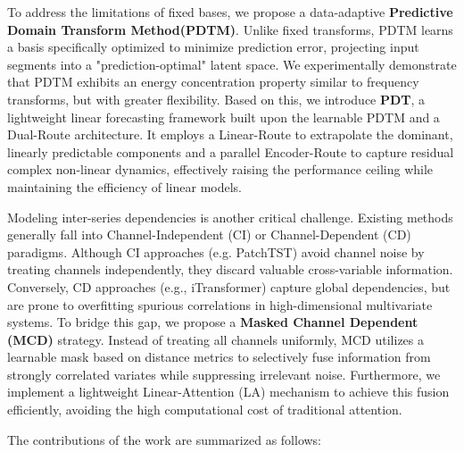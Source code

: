 \documentclass[final,3p,times]{elsarticle}
\begin{document}
To address the limitations of fixed bases, we propose a data-adaptive \textbf{Predictive Domain Transform Method(PDTM)}. Unlike fixed transforms, PDTM learns a basis specifically optimized to minimize prediction error, projecting input segments into a "prediction-optimal" latent space. We experimentally demonstrate that PDTM exhibits an energy concentration property\cite{yi2023frequency} similar to frequency transforms, but with greater flexibility. Based on this, we introduce \textbf{PDT}, a lightweight linear forecasting framework built upon the learnable PDTM and a Dual-Route architecture. It employs a Linear-Route to extrapolate the dominant, linearly predictable components and a parallel Encoder-Route to capture residual complex non-linear dynamics, effectively raising the performance ceiling while maintaining the efficiency of linear models. 

Modeling inter-series dependencies is another critical challenge\cite{wang2020deep}. Existing methods generally fall into Channel-Independent (CI) or Channel-Dependent (CD) paradigms\cite{luo2025adapformer}. Although CI approaches (e.g. PatchTST\cite{nie2023a}) avoid channel noise by treating channels independently, they discard valuable cross-variable information. Conversely, CD approaches (e.g., iTransformer\cite{liu2024itransformer}) capture global dependencies, but are prone to overfitting spurious correlations in high-dimensional multivariate systems. To bridge this gap, we propose a \textbf{Masked Channel Dependent (MCD)} strategy. Instead of treating all channels uniformly, MCD utilizes a learnable mask based on distance metrics to selectively fuse information from strongly correlated variates while suppressing irrelevant noise. Furthermore, we implement a lightweight Linear-Attention (LA) mechanism to achieve this fusion efficiently, avoiding the high computational cost of traditional attention\cite{Vaswani2017_atten}.

The contributions of the work are summarized as follows:
\end{document}
